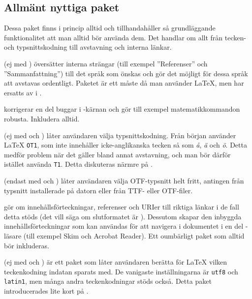 \documentclass[10pt,../../a4.tex]{subfiles}
\begin{document}
\subsection{Allmänt nyttiga paket}
Dessa paket finns i princip alltid och tillhandahåller så grundläggande
funktionalitet att man alltid bör använda dem. Det handlar om allt från
tecken- och typsnittskodning till avstavning och interna länkar.

\begin{description}
	\item[\pack{babel}] (ej med \XeTeX)
	översätter interna strängar (till exempel ”Referenser” och 
	”Sammanfattning”) till det språk som önskas och gör det möjligt för
	dessa språk att avstavas ordentligt. Paketet är ett måste då man
	använder \LaTeX, men har ersatts av  i \XeTeX.
	
	\item[\pack{fixltx2e}]
	korrigerar en del buggar i \LaTeXe-kärnan och gör till 
	exempel matematikkommandon robusta. Inkludera alltid.
	
	\item[\pack{fontenc}] (ej med \XeTeX{} och )
	låter användaren välja typsnittskodning. Från början använder \LaTeX{}
	\texttt{OT1}, som inte innehåller icke-anglikanska tecken så som
	\emph{å}, \emph{ä} och \emph{ö}. Detta medför problem när det gäller
	bland annat avstavning, och man bör därför istället använda 
	\texttt{T1}. Detta diskuteras närmre på .

	\item[\pack{fontspec}] (endast med \XeTeX{} och )
	låter användaren välja \textsc{OTF}-typsnitt helt fritt, antingen
	från typsnitt installerade på datorn eller från \textsc{TTF}- eller
	\textsc{OTF}-filer.
	
	\item[\pack{hyperref}]
	gör om innehållsförteckningar, referenser och URIer till riktiga
	länkar i de fall detta stöds (det vill säga om slutformatet är \PDF).
	Dessutom skapar den inbyggda innehållsförteckningar som kan användas
	för att navigera i dokumentet i en del \PDF-läsare (till exempel Skim
	och Acrobat Reader).
	Ett oumbärligt paket som alltid bör inkluderas.
	
	\item[\pack{inputenx}] (ej med \XeTeX{} och )
	är ett paket som låter användaren berätta för \LaTeX{} vilken
	teckenkodning indatan sparats med. De vanigaste inställningarna är
	\texttt{utf8} och \texttt{latin1}, men många andra teckenkodningar
	stöds också.
	Detta paket introducerades lite kort på .


\end{description}
\end{document}
